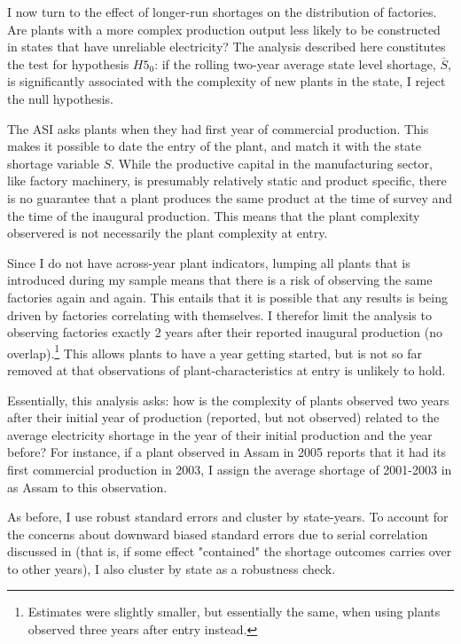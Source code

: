 \documentclass[11pt]{article}
\begin{document}
I now turn to the effect of longer-run shortages on the distribution of factories. Are plants with a more complex production output less likely to be constructed in states that have unreliable electricity? The analysis described here constitutes the test for hypothesis $H5_0$: if the rolling two-year average state level shortage, $\bar{S}$, is significantly associated with the complexity of new plants in the state, I reject the null hypothesis. 

The ASI asks plants when they had first year of commercial production. This makes it possible to date the entry of the plant, and match it with the state shortage variable $S$. While the productive capital in the manufacturing sector, like factory machinery, is presumably relatively static and product specific, there is no guarantee that a plant produces the same product at the time of survey and the time of the inaugural production. This means that the plant complexity observered is not necessarily the plant complexity at entry. 

Since I do not have across-year plant indicators, lumping all plants that is introduced during my sample means that there is a risk of observing the same factories again and again. This entails that it is possible that any results is being driven by factories correlating with themselves. I therefor limit the analysis to observing factories exactly 2 years after their reported inaugural production (no overlap).\footnote{Estimates were slightly smaller, but essentially the same, when using plants observed three years after entry instead.} This allows plants to have a year getting started, but is not so far removed at that observations of plant-characteristics at entry is unlikely to hold.

Essentially, this analysis asks: how is the complexity of plants observed two years after their initial year of production (reported, but not observed) related to the average electricity shortage in the year of their initial production and the year before? For instance, if a plant observed in Assam in 2005 reports that it had its first commercial production in 2003, I assign the average shortage of 2001-2003 in as Assam to this observation. 

As before, I use robust standard errors and cluster by state-years. To account for the concerns about downward biased standard errors due to serial correlation discussed in \cite{bertrand_how_2004} (that is, if some effect "contained" the shortage outcomes carries over to other years), I also cluster by state as a robustness check.
\end{document}
